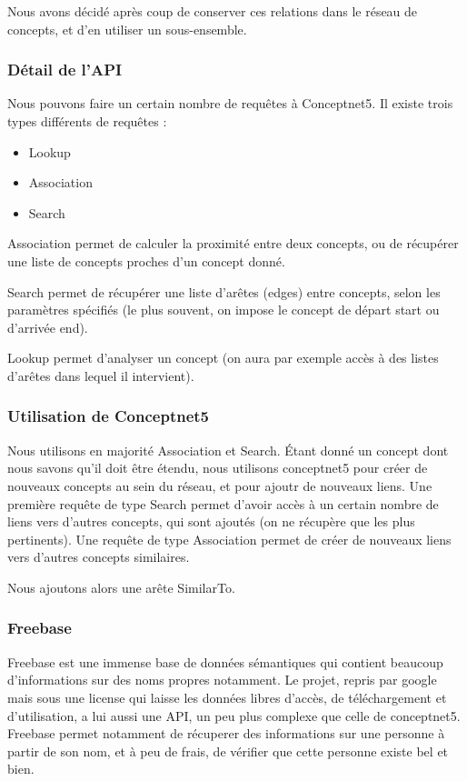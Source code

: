 \documentclass{article}           %
\begin{document}
Nous avons décidé après coup de conserver ces relations dans le réseau de concepts, et d'en utiliser un sous-ensemble.

\subsubsection{Détail de l'API}

Nous pouvons faire un certain nombre de requêtes à Conceptnet5. Il existe trois types différents de requêtes :
\begin{itemize}
 \item Lookup
 \item Association
 \item Search
\end{itemize}
Association permet de calculer la proximité entre deux concepts, ou de récupérer une liste de concepts proches d'un concept donné.

Search permet de récupérer une liste d'arêtes (edges) entre concepts, selon les paramètres spécifiés (le plus souvent, on impose le concept de départ start ou d'arrivée end). 

Lookup permet d'analyser un concept (on aura par exemple accès à des listes d'arêtes dans lequel il intervient).


\subsubsection{Utilisation de Conceptnet5}

Nous utilisons en majorité Association et Search.
Étant donné un concept dont nous savons qu'il doit être étendu, nous utilisons conceptnet5 pour créer de nouveaux concepts au sein du réseau, et pour ajoutr de nouveaux liens. Une première requête de type Search permet d'avoir accès à un certain nombre de liens vers d'autres concepts, qui sont ajoutés (on ne récupère que les plus pertinents). Une requête de type Association permet de créer de nouveaux liens vers d'autres concepts similaires.

Nous ajoutons alors une arête SimilarTo.



    
\subsubsection{Freebase}

Freebase est une immense base de données sémantiques qui contient beaucoup d'informations sur des noms propres notamment. Le projet, repris par google mais sous une license qui laisse les données libres d'accès, de téléchargement et d'utilisation, a lui aussi une API, un peu plus complexe que celle de conceptnet5. Freebase permet notamment de récuperer des informations sur une personne à partir de son nom, et à peu de frais, de vérifier que cette personne existe bel et bien.
\end{document}
